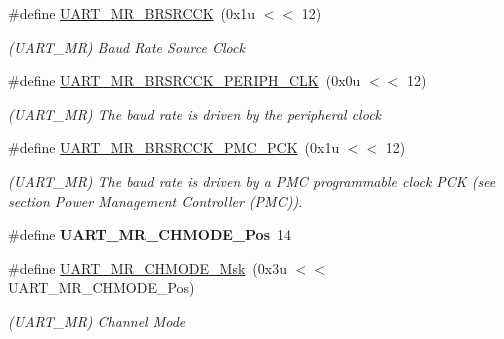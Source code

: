 \begin{DoxyCompactItemize}
\mbox{\label{group__SAMS70__UART_gade244123e6a00af0a11e85f17bef8fe5}} 
\#define \mbox{\hyperlink{group__SAMS70__UART_gade244123e6a00af0a11e85f17bef8fe5}{U\+A\+R\+T\+\_\+\+M\+R\+\_\+\+B\+R\+S\+R\+C\+CK}}~(0x1u $<$$<$ 12)
\begin{DoxyCompactList}\small\item\em (U\+A\+R\+T\+\_\+\+MR) Baud Rate Source Clock \end{DoxyCompactList}\item 
\mbox{\label{group__SAMS70__UART_ga0025905c99e51c449ce67a4c670e9aad}} 
\#define \mbox{\hyperlink{group__SAMS70__UART_ga0025905c99e51c449ce67a4c670e9aad}{U\+A\+R\+T\+\_\+\+M\+R\+\_\+\+B\+R\+S\+R\+C\+C\+K\+\_\+\+P\+E\+R\+I\+P\+H\+\_\+\+C\+LK}}~(0x0u $<$$<$ 12)
\begin{DoxyCompactList}\small\item\em (U\+A\+R\+T\+\_\+\+MR) The baud rate is driven by the peripheral clock \end{DoxyCompactList}\item 
\mbox{\label{group__SAMS70__UART_gacb650203506640645a5b957f3bc92316}} 
\#define \mbox{\hyperlink{group__SAMS70__UART_gacb650203506640645a5b957f3bc92316}{U\+A\+R\+T\+\_\+\+M\+R\+\_\+\+B\+R\+S\+R\+C\+C\+K\+\_\+\+P\+M\+C\+\_\+\+P\+CK}}~(0x1u $<$$<$ 12)
\begin{DoxyCompactList}\small\item\em (U\+A\+R\+T\+\_\+\+MR) The baud rate is driven by a P\+MC programmable clock P\+CK (see section Power Management Controller (P\+MC)). \end{DoxyCompactList}\item 
\mbox{\label{group__SAMS70__UART_gadbe17e107662fa9f0d34d964911eb4bb}} 
\#define {\bfseries U\+A\+R\+T\+\_\+\+M\+R\+\_\+\+C\+H\+M\+O\+D\+E\+\_\+\+Pos}~14
\item 
\mbox{\label{group__SAMS70__UART_gaae4c24ca9b88ad0fcc45c6525705d23c}} 
\#define \mbox{\hyperlink{group__SAMS70__UART_gaae4c24ca9b88ad0fcc45c6525705d23c}{U\+A\+R\+T\+\_\+\+M\+R\+\_\+\+C\+H\+M\+O\+D\+E\+\_\+\+Msk}}~(0x3u $<$$<$ U\+A\+R\+T\+\_\+\+M\+R\+\_\+\+C\+H\+M\+O\+D\+E\+\_\+\+Pos)
\begin{DoxyCompactList}\small\item\em (U\+A\+R\+T\+\_\+\+MR) Channel Mode \end{DoxyCompactList}\item 

\end{DoxyCompactItemize}
